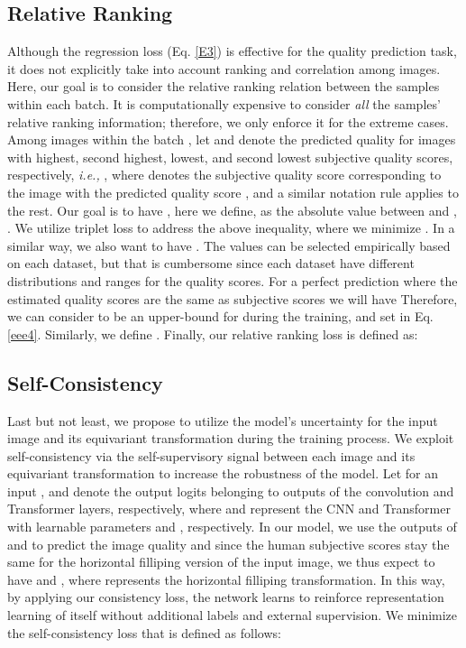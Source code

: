 \documentclass[10pt,twocolumn,letterpaper]{article}
\begin{document}
\subsection{Relative Ranking}
\label{S3.4}
Although the regression loss (Eq. \ref{E3}) is effective for the quality prediction task, it does not explicitly take into account ranking and correlation among images.
Here, our goal is to consider the relative ranking relation between the samples within each batch.
It is computationally expensive to consider \textit{all} the samples' relative ranking information; therefore, we only enforce it for the extreme cases.
 Among  images within the batch  , let  and  denote the predicted quality for images with highest, second highest, lowest, and second lowest subjective quality scores, respectively, \textit{i.e.,}  , where  denotes the subjective quality score corresponding to the image with the predicted quality score , and a similar notation rule applies to the rest.
Our goal is to have , here we define,  as the absolute value between  and ,  . 
We utilize triplet loss to address the above inequality, where we minimize .
In a similar way, we also want to have .
The  values can be selected empirically based on each dataset, but that is cumbersome since each dataset have different distributions and ranges for the quality scores.
For a perfect prediction where the estimated quality scores are the same as subjective scores we will have 
Therefore, we can consider  to be an upper-bound for  during the training, and set   in Eq. \ref{eee4}.
Similarly,  we define . 
Finally, our relative ranking loss is defined as:
\vspace{-0.2 cm}


\vspace{-0.2 cm}
\subsection{Self-Consistency}
\label{S3.5}
Last but not least, we propose to utilize the model's uncertainty for the
input image and its equivariant transformation during the training process.
We exploit  self-consistency via the self-supervisory signal between
each image and its equivariant transformation  to increase the robustness 
of the model. 
Let for an input ,  and   denote the output logits  
 belonging to outputs of the convolution   and Transformer layers, respectively, where  and  represent the CNN and Transformer  with learnable parameters  and , respectively. 
 In our model, we use the outputs of   and  to predict the image quality and since the human subjective scores stay the same for the horizontal filliping version of the input image, we thus expect to have  and , where  represents the horizontal filliping transformation. 
 In this way, by applying our consistency loss, the network  learns to reinforce representation learning of itself without   additional labels and external supervision.
We minimize the self-consistency loss that is defined as follows:
\end{document}
